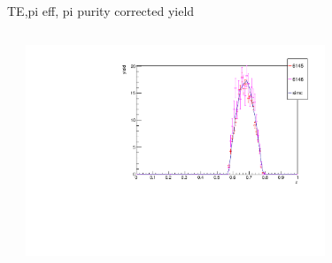 \begin{frame}{TE,pi eff, pi purity corrected yield}
\begin{columns}
\begin{column}[T]{0.5\textwidth}
\end{column}
\begin{column}[T]{0.5\textwidth}
\includegraphics[width = 0.7\textwidth]{results/yield/check/yieldcheck_110_pos.pdf}
\end{column}
\end{columns}
\end{frame}
